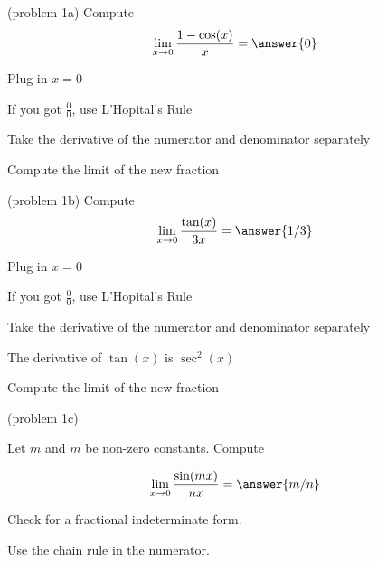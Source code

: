 \documentclass{ximera}
\begin{document}
\begin{problem}(problem 1a)
  Compute
  \[
  \lim_{x \to 0} \frac{1 - \cos(x)}{x} = \answer{0}
  \]
  
    \begin{hint}
      Plug in $x=0$
    \end{hint}
    \begin{hint}
      If you got $\frac00$, use L'Hopital's Rule
    \end{hint}
    \begin{hint}
      Take the derivative of the numerator and denominator separately
    \end{hint}
    \begin{hint}
      Compute the limit of the new fraction
    \end{hint}
    
		
	
\end{problem}



\begin{problem}(problem 1b)
  Compute
  \[
  \lim_{x \to 0} \frac{\tan(x)}{3x} = \answer{1/3}
  \]
  
    \begin{hint}
      Plug in $x=0$
    \end{hint}
    \begin{hint}
      If you got $\frac00$, use L'Hopital's Rule
    \end{hint}
    \begin{hint}
      Take the derivative of the numerator and denominator separately
    \end{hint}
		\begin{hint}
		  The derivative of $\tan(x)$ is $\sec^2(x)$
    \end{hint}
		\begin{hint}
      Compute the limit of the new fraction
    \end{hint}
	
\end{problem}





\begin{problem}(problem 1c)

Let $m$ and $m$ be non-zero constants. Compute

        \[  \lim_{x \to 0} \frac{\sin(mx)}{nx} = \answer{m/n} \]
  
   \begin{hint}   Check for a fractional indeterminate form.  \end{hint}
    
   \begin{hint}   Use the chain rule in the numerator.        \end{hint}
		
\end{problem}
\end{document}
